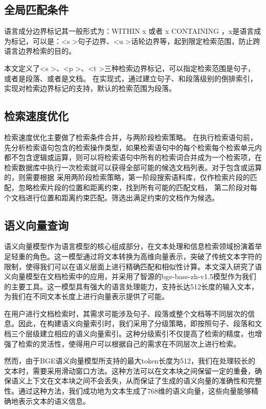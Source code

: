 \documentclass[11pt]{article}
\begin{document}
\begin{CJK*}{UTF8}{gbsn}
\subsection{全局匹配条件}

语言成分边界标记其一般形式为：WITHIN x 或者 x CONTAINING ，x是语言成为标记，可以是：\textless s \textgreater 句子边界、\textless u \textgreater 话轮边界等，起到限定检索范围，防止跨语言边界检索的目的。

本文定义了\textless s \textgreater、\textless p \textgreater 、\textless t \textgreater 三种检索边界标记，可以指定检索范围是句子，或者是段落、或者是文档。
在实现式，通过建立句子、和段落级别的倒排索引，实现对检索边界标记的支持，默认的检索范围为段落。


\subsection{检索速度优化}

检索速度优化主要做了检索条件合并，与两阶段检索策略。
在执行检索语句前，先分析检索语句包含的检索操作类型，如果检索语句中的每个检索每个检索单元内都不包含逻辑或运算，则可以将检索语句中所有的检索词合并成为一个检索项，在检索数据库中执行一次检索就可以获得全部可能的候选文档列表。对于包含或运算的，则需要根据
采用两阶段检索策略，第一阶段搜索语料库，仅作检索片段的匹配，忽略检索片段的位置和距离约束，找到所有可能的匹配文档， 第二阶段对每个文档进行位置和距离约束匹配。筛选出满足约束的文档作为候选。

\subsection{语义向量查询}

语义向量模型作为语言模型的核心组成部分，在文本处理和信息检索领域扮演着举足轻重的角色。这一模型通过将文本转换为高维向量表示，突破了传统文本字符的限制，使得我们可以在语义层面上进行精确匹配和相似性计算。本文深入研究了语义向量模型在文档检索中的应用，并采用了智源的bge-base-zh-v1.5模型作为我们的主要工具。这一模型具有强大的语言处理能力，支持长达512长度的输入文本，为我们在不同文本长度上进行向量表示提供了可能。

在用户进行文档检索时，其需求可能涉及句子、段落或整个文档等不同层次的信息。因此，在构建语义向量索引时，我们采用了分级策略，即按照句子、段落和文档三个层级建立相应的语义向量索引。这种分级索引不仅提高了检索的精度，也增强了检索的灵活性，使得用户可以根据自己的需求在不同层次上进行检索。

然而，由于BGE语义向量模型所支持的最大token长度为512，我们在处理较长的文本时，需要采用滑动窗口方法。这种方法可以在文本块之间保留一定的重叠，确保语义上下文在文本块之间不会丢失，从而保证了生成的语义向量的准确性和完整性。通过这种方法，我们成功地为文本生成了768维的语义向量，这些向量能够精确地表示文本的语义信息。


\end{CJK*}
\end{document}
